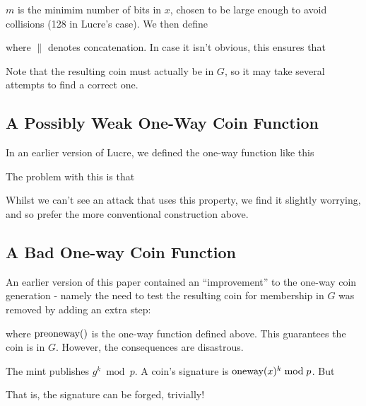 \documentclass[a4paper,titlepage]{article}
\begin{document}

$m$ is the minimim number of bits in $x$, chosen to be large
enough to avoid collisions (128 in Lucre's case). We then define


where $\|$ denotes concatenation. In case it isn't obvious, this
ensures that


Note that the resulting coin must actually be in $G$, so it may take
several attempts to find a correct one.

\subsection{A Possibly Weak One-Way Coin Function}

In an earlier version of Lucre, we defined the one-way function like
this



The problem with this is that


Whilst we can't see an attack that uses this property, we find it
slightly worrying, and so prefer the more conventional construction above.

\subsection{A Bad One-way Coin Function}
\label{sec:badoneway}

An earlier version of this paper contained an ``improvement'' to the
one-way coin generation - namely the need to test the resulting coin
for membership in $G$ was removed by adding an extra step:


where $\preoneway$ is the one-way function defined above. This guarantees
the coin is in $G$. However, the consequences are disastrous\cite{Wagner}.

The mint publishes $g^k \bmod p$. A coin's signature is $\textrm{oneway}(x)^k \bmod p$. But


That is, the signature can be forged, trivially!
\end{document}
